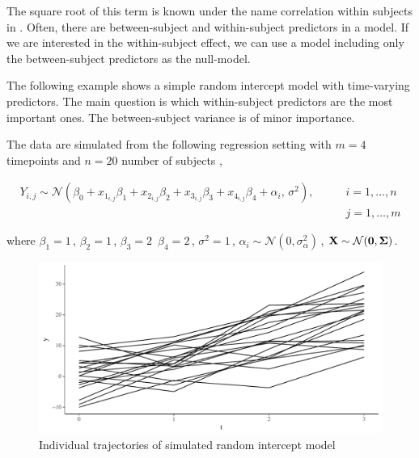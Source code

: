 \documentclass[11pt,a4paper,twoside]{book}\usepackage[]{graphicx}\usepackage[]{color}
\newenvironment{knitrout}{}{} %
\begin{document}
The square root of this term is known under the name correlation within subjects in \cite{Bland1995}. Often, there are between-subject and within-subject predictors in a model. If we are interested in the within-subject effect, we can use a model including only the between-subject predictors as the null-model.

The following example shows a simple random intercept model with time-varying predictors. The main question is which within-subject predictors are the most important ones. The between-subject variance is of minor importance. 

The data are simulated from the following regression setting with $m = 4$ timepoints and $n = 20$ number of subjects ,

\begin{align*} 
Y_{i,j} \sim \mathcal{N}(\beta_{0}+x_{1_{i,j}} \beta_{1}+x_{2_{i,j}} \beta_{2}+x_{3_{i,j}} \beta_{3}+x_{4_{i,j}} \beta_{4} + \alpha_{i}, \, \sigma^2), \qquad &i = 1, \dots, n \\  &j = 1, \dots, m
\end{align*} 

where $\beta_{1} = 1 \,$,  $\beta_{2} = 1 \,$,   $\beta_{3} = 2 \,$  $\beta_{4}=2 \,$, $\sigma^2 = 1 \, $, $\alpha_{i} \sim \mathcal{N}(0, \sigma_{\alpha}^2) \,$, ${\mathbf{X}} \sim \mathcal{N}({\mathbf{0}}, {\boldsymbol{\Sigma}}{})$.



\begin{knitrout}
\color{fgcolor}\begin{figure}

{\centering \includegraphics[width=\textwidth-3cm]{figure/ch04_fig_repeated_plot_ri-1} 

}

\caption[Individual trajectories of simulated random intercept model]{Individual trajectories of simulated random intercept model}\label{fig:.repeated.plot.ri}
\end{figure}


\end{knitrout}
\end{document}
